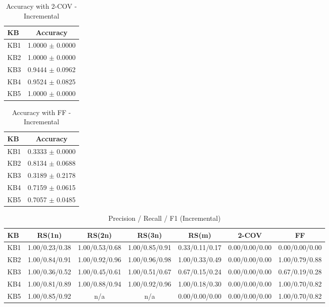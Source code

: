 \begin{table}[htbp]
\centering
\caption{Accuracy with 2-COV - Incremental}
\label{tab:table10_incremental}
\begin{tabular}{lc}
\toprule
KB & Accuracy \\
\midrule
KB1 & 1.0000 $\pm$ 0.0000 \\
KB2 & 1.0000 $\pm$ 0.0000 \\
KB3 & 0.9444 $\pm$ 0.0962 \\
KB4 & 0.9524 $\pm$ 0.0825 \\
KB5 & 1.0000 $\pm$ 0.0000 \\
\bottomrule
\end{tabular}
\end{table}

\begin{table}[htbp]
\centering
\caption{Accuracy with FF - Incremental}
\label{tab:table11_incremental}
\begin{tabular}{lc}
\toprule
KB & Accuracy \\
\midrule
KB1 & 0.3333 $\pm$ 0.0000 \\
KB2 & 0.8134 $\pm$ 0.0688 \\
KB3 & 0.3189 $\pm$ 0.2178 \\
KB4 & 0.7159 $\pm$ 0.0615 \\
KB5 & 0.7057 $\pm$ 0.0485 \\
\bottomrule
\end{tabular}
\end{table}

\begin{table}[htbp]
\centering
\caption{Precision / Recall / F1 (Incremental)}
\label{tab:fold_metrics_incremental}
\begin{tabular}{lcccccc}
\toprule
KB & RS(1n) & RS(2n) & RS(3n) & RS(m) & 2-COV & FF \\
\midrule
KB1 & 1.00/0.23/0.38 & 1.00/0.53/0.68 & 1.00/0.85/0.91 & 0.33/0.11/0.17 & 0.00/0.00/0.00 & 0.00/0.00/0.00 \\
KB2 & 1.00/0.84/0.91 & 1.00/0.92/0.96 & 1.00/0.96/0.98 & 1.00/0.33/0.49 & 0.00/0.00/0.00 & 1.00/0.79/0.88 \\
KB3 & 1.00/0.36/0.52 & 1.00/0.45/0.61 & 1.00/0.51/0.67 & 0.67/0.15/0.24 & 0.00/0.00/0.00 & 0.67/0.19/0.28 \\
KB4 & 1.00/0.81/0.89 & 1.00/0.88/0.94 & 1.00/0.92/0.96 & 1.00/0.18/0.30 & 0.00/0.00/0.00 & 1.00/0.70/0.82 \\
KB5 & 1.00/0.85/0.92 & n/a & n/a & 0.00/0.00/0.00 & 0.00/0.00/0.00 & 1.00/0.70/0.82 \\
\bottomrule
\end{tabular}
\end{table}

